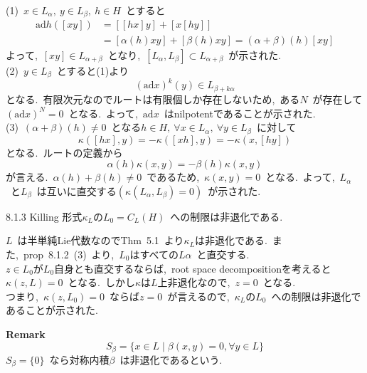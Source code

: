 \documentclass[uplatex,dvipdfmx]{jsarticle}
\begin{document}
\begin{myproof}
    (1)~$x\in L_\alpha,~y\in L_\beta ,~h\in H$~とすると
    \begin{equation*}
        \begin{split}
            \text{ad}h([xy]) &= [[hx]y] + [x[hy]] \\
            &= [\alpha(h)xy] + [\beta(h)xy] = (\alpha+\beta)(h)[xy]
        \end{split}
    \end{equation*}
    よって,~$[xy]\in L_{\alpha+\beta}$~となり,~$[L_\alpha, L_\beta] \subset L_{\alpha + \beta}$~が示された.\\
    (2)~$y\in L_\beta$~とすると(1)より
    \begin{equation*}
        (\text{ad}x)^k(y) \in L_{\beta + k\alpha}
    \end{equation*}
    となる.~有限次元なのでルートは有限個しか存在しないため,~ある$N$~が存在して$(\text{ad}x)^N = 0$~となる.~よって,~$\text{ad}x$~はnilpotentであることが示された.\\
    (3)~$(\alpha+\beta)(h) \neq 0$~となる$h\in H,~\forall x \in L_\alpha,~\forall y \in L_\beta$~に対して
    \begin{equation*}
        \kappa([hx],y) = -\kappa([xh],y) = -\kappa(x,[hy])
    \end{equation*}
    となる.~ルートの定義から
    \begin{equation*}
        \alpha(h)\kappa(x,y) = -\beta(h)\kappa(x,y)
    \end{equation*}
    が言える.~$\alpha(h) + \beta(h) \neq 0$~であるため,~$\kappa(x,y) = 0$~となる.~よって,~$L_\alpha$~と$L_\beta$~は互いに直交する$(\kappa(L_\alpha, L_\beta) = 0)$~が示された.
\end{myproof}
\begin{mycor}{8.1.3}
    Killing 形式$\kappa_L$の$L_0 = C_L(H)$~への制限は非退化である.
\end{mycor}
\begin{myproof}
    $L$~は半単純Lie代数なのでThm~5.1~より$\kappa_L$は非退化である.~また,~prop~8.1.2~(3)~より,~$L_0$はすべての$L\alpha$~と直交する.\\
    $z\in L_0$が$L_0$自身とも直交するならば,~root space decompositionを考えると$\kappa(z,L)=0$~となる.~しかし$\kappa$は$L$上非退化なので,~$z = 0$~となる.\\
    つまり,~$\kappa (z,L_0)=0$~ならば$z=0$~が言えるので,~$\kappa_L$の$L_0$~への制限は非退化であることが示された.
\end{myproof}
\textbf{Remark}\\
\begin{equation*}
    S_\beta = \{x\in L \mid \beta(x,y)= 0 ,\forall y \in L \}
\end{equation*}
$S_\beta = \{0\}$~なら対称内積$\beta$~は非退化であるという.
\newpage
\end{document}
